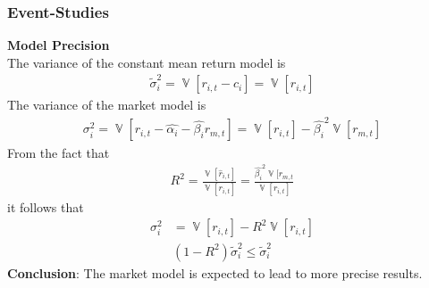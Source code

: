 \documentclass[xcolor=dvipsnames, english, 8pt]{beamer}
\DeclareMathOperator{\V}{\mathbb{V}}
\begin{document}
        \begin{frame}
            \frametitle{Event-Studies}
        \textbf{Model Precision}\vspace{0.15cm}\\
        The variance of the constant mean return model is
        \begin{align}
            \tilde{\sigma}_i^2 = \V[r_{i,t} - c_i] = \V[r_{i,t}]
        \end{align}
        The variance of the market model is
        \begin{align}
            \sigma_i^2 = \V[r_{i,t} -\hat{\alpha_i} - \hat{\beta_i} r_{m,t}] = \V[r_{i,t}] -  \hat{\beta_i}^2 \V[r_{m,t}]
        \end{align}
        From the fact that
        \begin{align}
            R^2 = \frac{\V[\hat{r}_{i,t}]}{\V[r_{i,t}]} = \frac{\hat{\beta_i}^2 \V[r_{m,t}}{\V[r_{i,t}]}
        \end{align}
        it follows that
        \begin{align}
            \sigma_i^2 &= \V[r_{i,t}] - R^2\V[r_{i,t}]\\
            & (1-R^2)\tilde{\sigma}_i^2\leq \tilde{\sigma}_i^2
        \end{align}
        \textbf{\color{ubRed}Conclusion}: The market model is expected to lead to more precise results.
        \end{frame}
\end{document}
